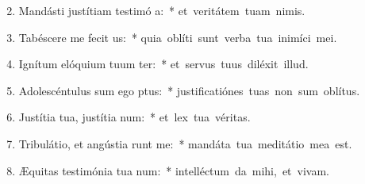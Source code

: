 \begin{flushleft}
\begin{enumerate}[leftmargin=*]
\setcounter{enumi}{1}

\item Mandásti justítiam testimó a:~* \mbox{et veritátem tuam nimis.}
\item Tabéscere me fecit  us:~* \mbox{quia oblíti sunt verba tua inimíci mei.}
\item Ignítum elóquium tuum ter:~* \mbox{et servus tuus diléxit illud.}
\item Adolescéntulus sum ego  ptus:~* \mbox{justificatiónes tuas non sum oblítus.}
\item Justítia tua, justítia  num:~* \mbox{et lex tua véritas.}
\item Tribulátio, et angústia runt me:~* \mbox{mandáta tua meditátio mea est.}
\item Æquitas testimónia tua  num:~* \mbox{intelléctum da mihi, et vivam.}


\end{enumerate}
\end{flushleft}

